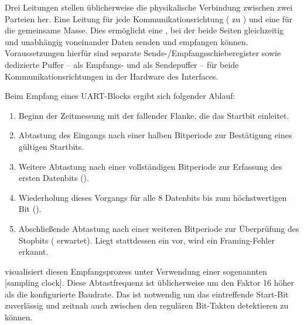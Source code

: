 Drei Leitungen stellen \"ublicherweise die physikalische Verbindung zwischen zwei Parteien her. Eine Leitung f\"ur jede Kommunikationsrichtung ( zu ) und eine f\"ur die gemeinsame Masse. Dies erm\"oglicht eine , bei der beide Seiten gleichzeitig und unabh\"angig voneinander Daten senden und empfangen k\"onnen. Voraussetzungen hierf\"ur sind separate Sende-/Empfangsschieberegister sowie dedizierte Puffer --  als Empfangs- und  als Sendepuffer -- f\"ur beide Kommunikationsrichtungen in der Hardware des Interfaces. \\

Beim Empfang eines UART-Blocks ergibt sich folgender Ablauf:

\begin{enumerate}
	\item Beginn der Zeitmessung mit der fallender Flanke, die das Startbit einleitet.
	\item Abtastung des Eingangs nach einer halben Bitperiode zur Best\"atigung eines g\"ultigen Startbits.
	\item Weitere Abtastung nach einer vollst\"andigen Bitperiode zur Erfassung des ersten Datenbits ().
	\item Wiederholung dieses Vorgangs f\"ur alle 8 Datenbits bis zum h\"ochstwertigen Bit ().
	\item Abschlie{\ss}ende Abtastung nach einer weiteren Bitperiode zur \"Uberpr\"ufung des Stopbits ( erwartet). Liegt stattdessen ein  vor, wird ein Framing-Fehler erkannt.
\end{enumerate}

\newpage
{} visualisiert diesen Empfangsprozess unter Verwendung einer sogenannten [sampling clock]. Diese Abtastfrequenz ist \"ublicherweise um den Faktor 16 h\"oher als die konfigurierte Baudrate. Das  ist notwendig um das eintreffende Start-Bit zuverl\"assig und zeitnah auch zwischen den regul\"aren Bit-Takten detektieren zu k\"onnen.

